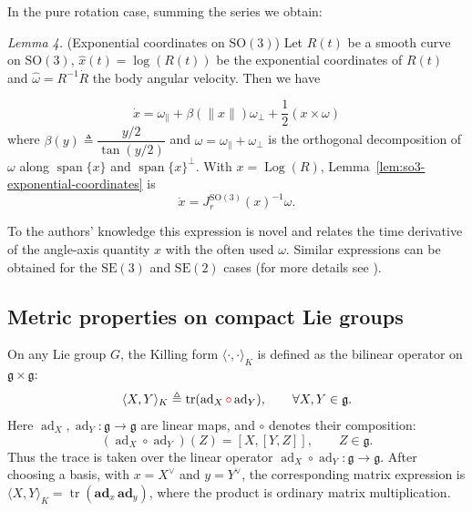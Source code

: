 \documentclass[10pt,twocolumn]{article}
\newcommand{\rev}[1]{\textcolor{red}{#1}}
\newenvironment{revision}{\color{red}}{}
\newcommand{\bad}{\mathbf{ad}}
\newcommand{\Log}{\operatorname{Log}}
\newcommand{\SO}{\mathrm{SO}}
\newcommand{\SE}{\mathrm{SE}}
\newcommand{\gfrak}{\mathfrak g}
\newcommand{\ad}{\operatorname{ad}}
\newcommand{\tr}{\operatorname{tr}}
\newcounter{paperitem}
\newcommand{\paperhead}[3]{\refstepcounter{paperitem}\par\medskip\noindent\textit{#1}\label{#3} #2\par}
\begin{document}
In the pure rotation case, summing the series we obtain:

\paperhead{Lemma 4.}{(Exponential coordinates on $\SO(3)$) Let $R(t)$ be a smooth curve on $\SO(3)$, $\widehat{x}(t)=\log(R(t))$ be the exponential coordinates of $R(t)$ and $\widehat\omega=R^{-1}\dot R$ the body angular velocity. Then we have}{lem:so3-exponential-coordinates}
\begin{equation*}
\dot x=\omega_{\parallel}+\beta(\|x\|)\omega_{\perp}+\frac12(x\times\omega)
\end{equation*}
where $\beta(y)\triangleq\dfrac{y/2}{\tan(y/2)}$ and $\omega=\omega_{\parallel}+\omega_{\perp}$ is the orthogonal decomposition of $\omega$ along $\operatorname{span}\{x\}$ and $\operatorname{span}\{x\}^{\perp}$.
\begin{revision}
With $x=\Log(R)$, Lemma~\ref{lem:so3-exponential-coordinates} is
\[
\dot x=J_r^{\SO(3)}(x)^{-1}\omega.
\]
\end{revision}

To the authors' knowledge this expression is novel and relates the time derivative of the angle-axis quantity $x$ with the often used $\omega$. Similar expressions can be obtained for the $\SE(3)$ and $\SE(2)$ cases (for more details see \cite{8}).

\subsection{Metric properties on compact Lie groups}\label{subsec:metric-compact}
On any Lie group $G$, the Killing form $\langle\cdot,\cdot\rangle_K$ is defined as the bilinear operator on $\gfrak\times\gfrak$:
\begin{equation*}
\langle X,Y\rangle_K\triangleq\tr(\ad_X\rev{\circ}\ad_Y),\qquad \forall X,Y\in\gfrak.
\end{equation*}
\begin{revision}
Here $\ad_X,\ad_Y:\gfrak\to\gfrak$ are linear maps, and $\circ$ denotes their composition:
\[
(\ad_X\circ\ad_Y)(Z)=[X,[Y,Z]],\qquad Z\in\gfrak.
\]
Thus the trace is taken over the linear operator $\ad_X\circ\ad_Y:\gfrak\to\gfrak$.
After choosing a basis, with $x=X^\vee$ and $y=Y^\vee$, the corresponding matrix expression is $\langle X,Y\rangle_K = \tr(\bad_x\,\bad_y)$, where the product is ordinary matrix multiplication.
\end{revision}
\end{document}
